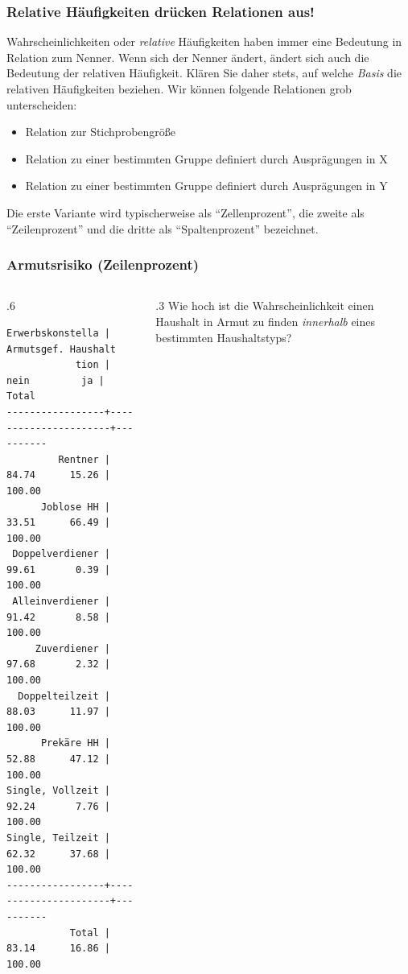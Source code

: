 \begin{frame}
\frametitle{Relative Häufigkeiten drücken Relationen aus!}

Wahrscheinlichkeiten oder \textit{relative} Häufigkeiten haben immer eine Bedeutung in Relation zum Nenner. Wenn sich der Nenner ändert, ändert sich auch die Bedeutung der relativen Häufigkeit. Klären Sie daher stets, auf welche \textit{Basis} die relativen Häufigkeiten beziehen. Wir können folgende Relationen grob unterscheiden: 

\begin{itemize}
   \item Relation zur Stichprobengröße 
   \item Relation zu einer bestimmten Gruppe definiert durch Ausprägungen in X
   \item Relation zu einer bestimmten Gruppe definiert durch Ausprägungen in Y
 \end{itemize} 

Die erste Variante wird typischerweise als ``Zellenprozent'', die zweite als ``Zeilenprozent'' und die dritte als ``Spaltenprozent'' bezeichnet. 

\end{frame}
\begin{frame}[fragile]
\frametitle{Armutsrisiko (Zeilenprozent)}
\begin{columns}
\begin{column}{.6\linewidth}
\begin{Verbatim}[fontsize=\small]
Erwerbskonstella |  Armutsgef. Haushalt
            tion |      nein         ja |     Total
-----------------+----------------------+----------
         Rentner |     84.74      15.26 |    100.00 
      Joblose HH |     33.51      66.49 |    100.00 
 Doppelverdiener |     99.61       0.39 |    100.00 
 Alleinverdiener |     91.42       8.58 |    100.00 
     Zuverdiener |     97.68       2.32 |    100.00 
  Doppelteilzeit |     88.03      11.97 |    100.00 
      Prekäre HH |     52.88      47.12 |    100.00 
Single, Vollzeit |     92.24       7.76 |    100.00 
Single, Teilzeit |     62.32      37.68 |    100.00 
-----------------+----------------------+----------
           Total |     83.14      16.86 |    100.00 

\end{Verbatim}
\end{column}
\begin{column}{.3\linewidth}
Wie hoch ist die Wahrscheinlichkeit einen Haushalt in Armut zu finden \textit{innerhalb} eines bestimmten Haushaltstyps? 
\end{column}
\end{columns}

\end{frame}
